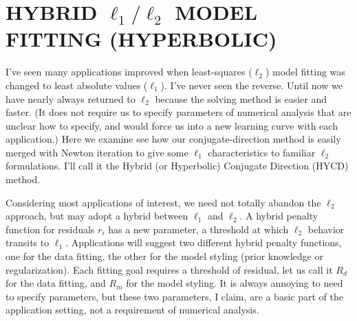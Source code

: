 \section{HYBRID $\ell_1/\ell_2$ MODEL FITTING (HYPERBOLIC)}
I've seen many applications improved when least-squares ($\ell_2$) model fitting was
changed to least absolute values ($\ell_1$).
I've never seen the reverse.
Until now we have nearly always returned to $\ell_2$ because
the solving method is easier and faster.
(It does not require us to specify parameters of numerical analysis
that are unclear how to specify,
and would force us into a new learning curve with each application.)
Here we examine see how our conjugate-direction method
is easily merged with Newton iteration
to give some $\ell_1$ characteristics to familiar $\ell_2$ formulations.
I'll call it the Hybrid (or Hyperbolic) Conjugate Direction (HYCD) method.
\par
Considering most applications of interest,
we need not totally abandon the $\ell_2$ approach,
but may adopt a hybrid between $\ell_1$ and $\ell_2$.
A hybrid penalty function for residuals $r_i$  has a new parameter,
a threshold at which $\ell_2$ behavior transits to $\ell_1$.
Applications will suggest
two different hybrid penalty functions,
one for the data fitting,
the other for the model styling (prior knowledge or regularization).
Each fitting goal requires a threshold of residual,
let us call it $R_d$ for the data fitting,
and $R_m$ for the model styling.
It is always annoying to need to specify parameters,
but these two parameters, I claim,
are a basic part of the application setting,
not a requirement of numerical analysis.


